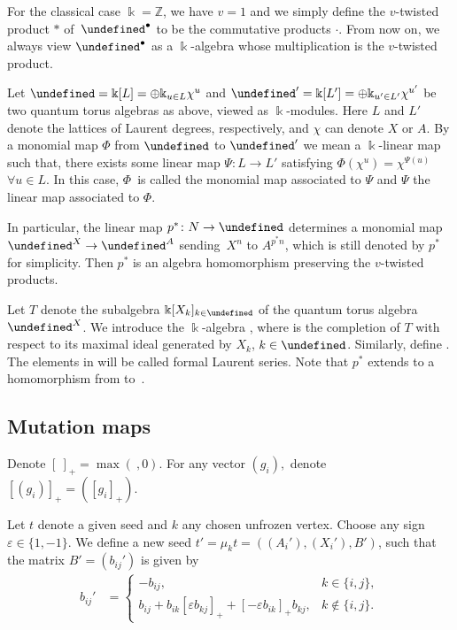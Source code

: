 \documentclass[10pt,a4paper]{amsart}
\newcommand{\kk}{\Bbbk}
\newcommand{\Z}{\mathbb{Z}}
\renewcommand{\hat}[1]{\widehat{#1}}
\newcommand{\opname}[1]{\operatorname{\mathsf{#1}}}
\newcommand{\ufv}{\opname{uf}}
\let\Mc\undefined
\let\Iufv\undefined
\let\LP\undefined
\let\hLP\undefined
\newcommand{\Mc}{M^\circ}
\newcommand{\Iufv}{I_{\ufv}}
\newcommand{\LP}{{\mathcal{LP}}}
\newcommand{\hLP}{\widehat{\mathcal{LP}}}
\numberwithin{equation}{section}
\begin{document}
For the classical case $\kk=\Z$, we have $v=1$ and we simply define the $v$-twisted product $*$ of~$\LP^\bullet$ to be the commutative products $\cdot$. From now on, we always view $\LP^\bullet$ as a $\kk$-algebra whose multiplication is the $v$-twisted product.

Let $\LP=\kk[L]=\oplus \kk_{u\in L} \chi^u$ and $\LP'=\kk[L']=\oplus \kk_{u'\in L'} \chi^{u'}$ be two quantum torus algebras as above, viewed as $\kk$-modules. Here $L$ and $L'$ denote the lattices of Laurent degrees, respectively, and $\chi$ can denote $X$ or $A$. By a monomial map $\varPhi$ from $\LP$ to $\LP'$ we mean a $\kk$-linear map such that, there exists some linear map $\varPsi\colon L\rightarrow L'$ satisfying $\varPhi(\chi^u)=\chi^{\varPsi(u)}$ $\forall u\in L$. In this case, $\varPhi$~is called the monomial map associated to $\varPsi$ and $\varPsi$ the linear map associated to $\varPhi$.

In particular, the linear map $p^*\colon N\rightarrow \Mc$ determines a monomial map $\LP^X\rightarrow \LP^A$ sending~$X^n$ to $A^{p^* n}$, which is still denoted by $p^*$ for simplicity. Then $p^*$ is an algebra homomorphism preserving the $v$-twisted products.

Let $T$ denote the subalgebra $\kk[X_k]_{k\in \Iufv}$ of the quantum torus algebra $\LP^X$. We introduce the $\kk$-algebra \smash{$\hLP^X=\LP^X\otimes_T \hat{T}$}, where \smash{$\hat{T}$} is the completion of $T$ with respect to its maximal ideal generated by $X_k$, $k\in \Iufv$. Similarly, define \smash{$\hLP^A:=\LP^A\otimes_{p^*T}p^*\hat{T}$}. The elements in \smash{$\hLP^\bullet$} will be called formal Laurent series. Note that $p^*$ extends to a homomorphism from \smash{$\hLP^X$} to~\smash{$\hLP^A$}.

\subsection{Mutation maps}\label{sec:mutation}

Denote $[\ ]_{+}=\max(\ ,0)$. For any vector $(g_{i}),$ denote $[(g_{i})]_{+}=([g_{i}]_{+})$.

Let $t$ denote a given seed and $k$ any chosen unfrozen vertex.
Choose any sign $\varepsilon\in\{1,-1\}$. We define a new seed $t'=\mu_{k}t=((A_{i}'),(X_{i}'),B')$,
such that the matrix $B'=(b_{ij}')$ is given by
\begin{align*}
b_{ij}' & =\begin{cases}
-b_{ij}, & k\in\{i,j\},\\
b_{ij}+b_{ik}[\varepsilon b_{kj}]_{+}+[-\varepsilon b_{ik}]_{+}b_{kj}, & k\notin\{i,j\}.
\end{cases}
\end{align*}
\end{document}
